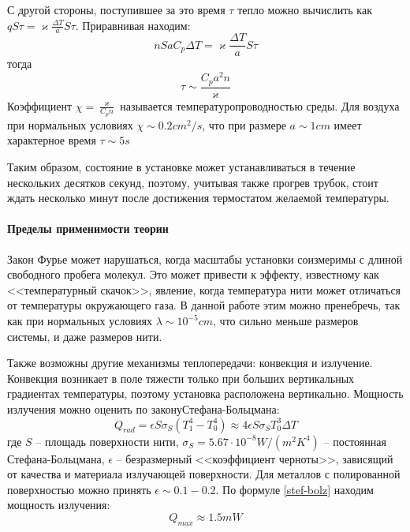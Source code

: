 \documentclass[a4paper,12pt]{report}
\begin{document}
    С другой стороны, поступившее за это время $\tau$ тепло можно вычислить как $qS\tau=\varkappa\frac{\Delta T}{a}S\tau$. Приравнивая находим:
    \begin{equation*}
        nSaC_p\Delta T=\varkappa\frac{\Delta T}{a}S\tau
    \end{equation*}
    тогда
    \begin{equation}
        \label{tau}
        \tau\sim\frac{C_pa^2n}{\varkappa}
    \end{equation}
    Коэффициент $\chi=\frac{\varkappa}{C_pn}$ называется температуропроводностью среды. Для воздуха при нормальных условиях $\chi\sim 0.2cm^2/s$, что при размере $a\sim 1cm$ имеет характерное время $\tau\sim 5s$

    Таким образом, состояние в установке может устанавливаться в течение нескольких десятков секунд, поэтому, учитывая также прогрев трубок, стоит ждать несколько минут после достижения термостатом желаемой температуры.

    \paragraph*{Пределы применимости теории} Закон Фурье может нарушаться, когда масштабы установки соизмеримы с длиной свободного пробега молекул. Это может привести к эффекту, известному как <<температурный скачок>>, явление, когда температура нити может отличаться от температуры окружающего газа. В данной работе этим можно пренебречь, так как при нормальных условиях $\lambda\sim 10^{-5}cm$, что сильно меньше размеров системы, и даже размеров нити.

    Также возможны другие механизмы теплопередачи: конвекция и излучение. Конвекция возникает в поле тяжести только при больших вертикальных градиентах температуры, поэтому установка расположена вертикально. Мощность излучения можно оценить по закону\newline Стефана-Больцмана:
    \begin{equation}
        \label{stef-bolz}
        Q_{rad}=\epsilon S \sigma_S(T_1^4-T_0^4)\approx 4\epsilon S\sigma_ST_0^3\Delta T
    \end{equation}
    где $S$ -- площадь поверхности нити, $\sigma_S=5.67\cdot 10^{-8}W/(m^2K^4)$ -- постоянная Стефана-Больцмана, $\epsilon$ -- безразмерный <<коэффициент черноты>>, зависящий от качества и материала излучающей поверхности. Для металлов с полированной поверхностью можно принять $\epsilon\sim 0.1-0.2$. По формуле \eqref{stef-bolz} находим мощность излучения:
    \begin{equation*}
        Q_{max} \approx 1.5mW
    \end{equation*}
\end{document}
